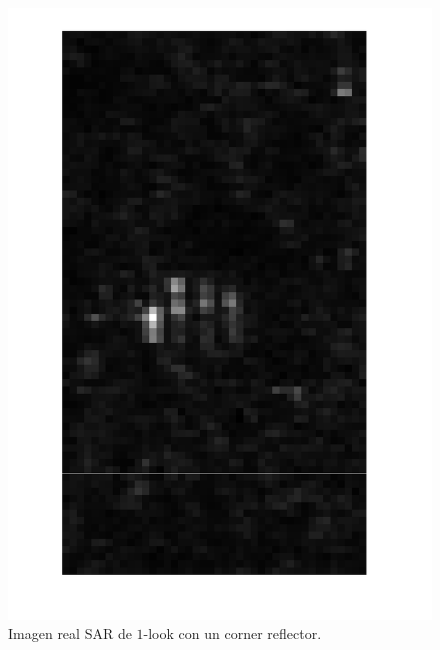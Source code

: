 \begin{figure}[H]
	\centering
	\includegraphics[angle =90,width=.8\linewidth]{../../Figures/Tesis/Capitulo6/Corner.pdf}
	\caption{\label{ImagenCornerReflector} Imagen real SAR de $1$-look con un corner reflector.}
\end{figure}

